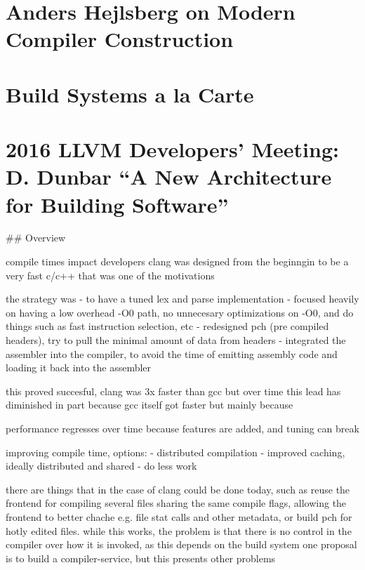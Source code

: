 \documentclass[12pt, a4paper]{report}
\begin{document}
\section*{Anders Hejlsberg on Modern Compiler Construction}

\cite{hejlsberg_modern_compiler_construction}

\section*{Build Systems a la Carte}

\cite{mokhov2018build}

\section*{2016 LLVM Developers’ Meeting: D. Dunbar “A New Architecture for Building Software”}

\cite{dunbar2016}

## Overview

  compile times impact developers
  clang was designed from the beginngin to be a very fast c/c++
  that was one of the motivations

  the strategy was
  - to have a tuned lex and parse implementation
  - focused heavily on having a low overhead -O0 path, no unnecesary optimizations on -O0, and do things such as fast instruction selection, etc
  - redesigned pch (pre compiled headers), try to pull the minimal amount of data from headers
  - integrated the assembler into the compiler, to avoid the time of emitting assembly code and loading it back into the assembler

  this proved succesful, clang was 3x faster than gcc
  but over time this lead has diminished
  in part because gcc itself got faster but mainly because

  performance regresses over time because features are added, and tuning can break

  improving compile time, options:
  - distributed compilation
  - improved caching, ideally distributed and shared
  - do less work

  there are things that in the case of clang could be done today, such as reuse the frontend for compiling several files sharing the same compile flags, allowing the frontend to better chache e.g. file stat calls and other metadata, or build pch for hotly edited files.
  while this works, the problem is that there is no control in the compiler over how it is invoked, as this depends on the build system
  one proposal is to build a compiler-service, but this presents other problems
\end{document}
